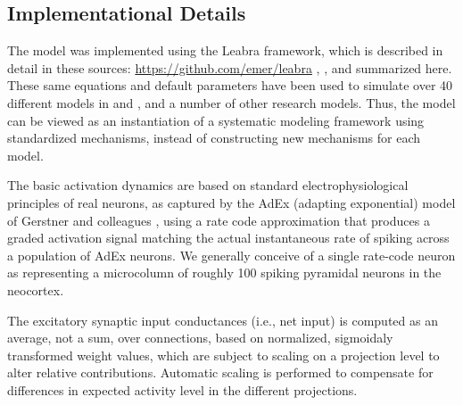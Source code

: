 \documentclass[11pt,twoside]{article}
\newif\myifpdf
\begin{document}

\subsection{Implementational Details}

The model was implemented using the Leabra framework, which is described in detail in these sources: \url{https://github.com/emer/leabra} \citet{OReillyMunakataFrankEtAl12}, \citet{OReillyMunakata00}, and summarized here.  These same equations and default parameters have been used to simulate over 40 different models in \citet{OReillyMunakataFrankEtAl12} and \citet{OReillyMunakata00}, and a number of other research models.  Thus, the model can be viewed as an instantiation of a systematic modeling framework using standardized mechanisms, instead of constructing new mechanisms for each model.

The basic activation dynamics are based on standard electrophysiological principles of real neurons, as captured by the AdEx (adapting exponential) model of Gerstner and colleagues \citep{BretteGerstner05}, using a rate code approximation that produces a graded activation signal matching the actual instantaneous rate of spiking across a population of AdEx neurons.  We generally conceive of a single rate-code neuron as representing a microcolumn of roughly 100 spiking pyramidal neurons in the neocortex.
 
The excitatory synaptic input conductances (i.e., net input) is computed as an average, not a sum, over connections, based on normalized, sigmoidaly transformed weight values, which are subject to scaling on a projection level to alter relative contributions. Automatic scaling is performed to compensate for differences in expected activity level in the different projections.
\end{document}
